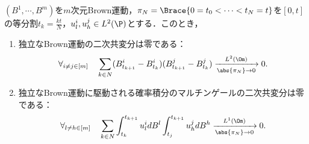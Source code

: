 \documentclass[uplatex,dvipdfmx]{jsreport}
\begin{document}
\begin{lemma}[Taylor展開から得る二階微分の交差項の評価]\label{lemma-Taylor-2-1-for-Ito-lemma}
    $(B^1,\cdots,B^m)$を$m$次元Brown運動，$\pi_N=\Brace{0=t_0<\cdots<t_N=t}$を$[0,t]$の等分割$t_k=\frac{kt}{N}$，$u^i_l,u^j_h\in L^2(\P)$とする．このとき，
    \begin{enumerate}
        \item 独立なBrown運動の二次共変分は零である：
        \[\forall_{i\ne j\in[m]}\quad\sum_{k\in N}(B^i_{t_{k+1}}-B^i_{t_k})(B^j_{t_{k+1}}-B^j_{t_k})\xrightarrow[\abs{\pi_N}\to0]{L^2(\Om)}0.\]
        \item 独立なBrown運動に駆動される確率積分のマルチンゲールの二次共変分は零である：
        \[\forall_{l\ne h\in[m]}\quad\sum_{k\in N}\int^{t_{k+1}}_{t_k}u^i_ldB^l\int^{t_{k+1}}_{t_j}u^j_hdB^h\xrightarrow[\abs{\pi_N}\to0]{L^1(\Om)}0.\]
    \end{enumerate}
\end{lemma}
\end{document}
